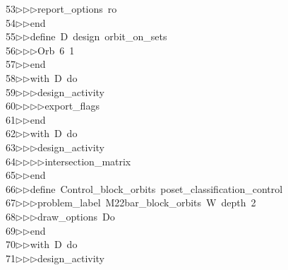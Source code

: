 \begin{tabbing}
53\>$\triangleright$\>$\triangleright$\>$\triangleright$\>report\_options\ ro\ \\[0pt]
54\>$\triangleright$\>$\triangleright$\>end\ \\[0pt]
55\>$\triangleright$\>$\triangleright$\>define\ D\ design\ orbit\_on\_sets\ \\[0pt]
56\>$\triangleright$\>$\triangleright$\>$\triangleright$\>Orb\ 6\ 1\ \\[0pt]
57\>$\triangleright$\>$\triangleright$\>end\ \\[0pt]
58\>$\triangleright$\>$\triangleright$\>with\ D\ do\ \\[0pt]
59\>$\triangleright$\>$\triangleright$\>$\triangleright$\>design\_activity\ \\[0pt]
60\>$\triangleright$\>$\triangleright$\>$\triangleright$\>$\triangleright$\>export\_flags\ \\[0pt]
61\>$\triangleright$\>$\triangleright$\>end\ \\[0pt]
62\>$\triangleright$\>$\triangleright$\>with\ D\ do\ \\[0pt]
63\>$\triangleright$\>$\triangleright$\>$\triangleright$\>design\_activity\ \\[0pt]
64\>$\triangleright$\>$\triangleright$\>$\triangleright$\>$\triangleright$\>intersection\_matrix\ \\[0pt]
65\>$\triangleright$\>$\triangleright$\>end\ \\[0pt]
66\>$\triangleright$\>$\triangleright$\>define\ Control\_block\_orbits\ poset\_classification\_control\ \\[0pt]
67\>$\triangleright$\>$\triangleright$\>$\triangleright$\>problem\_label\ M22bar\_block\_orbits\ W\ depth\ 2\ \\[0pt]
68\>$\triangleright$\>$\triangleright$\>$\triangleright$\>draw\_options\ Do\ \\[0pt]
69\>$\triangleright$\>$\triangleright$\>end\ \\[0pt]
70\>$\triangleright$\>$\triangleright$\>with\ D\ do\ \\[0pt]
71\>$\triangleright$\>$\triangleright$\>$\triangleright$\>design\_activity\ \\[0pt]

\end{tabbing}
